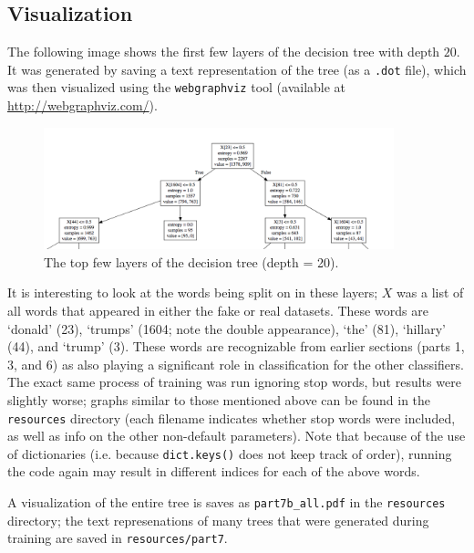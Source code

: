 \documentclass{article}
\begin{document}
   \subsection{Visualization}
   The following image shows the first few layers of the decision tree with depth $20$. It was generated by saving
   a text representation of the tree (as a \texttt{.dot} file), which was then visualized using the
   \texttt{webgraphviz} tool (available at \url{http://webgraphviz.com/}).
      \begin{figure}[h] \centering
         \includegraphics[width=4in]{resources/part7b_stopwords}
         \caption{The top few layers of the decision tree (depth = 20).}
         \label{part7b}
      \end{figure}

   It is interesting to look at the words being split on in these layers; $X$ was a list of all words
   that appeared in either the fake or real datasets. These words are `donald' (23), `trumps' (1604; note the
   double appearance), `the' (81), `hillary' (44), and `trump' (3). These words are recognizable from earlier
   sections (parts 1, 3, and 6) as also playing a significant role in classification for the other classifiers.
   The exact same process of training was run
   ignoring stop words, but results were slightly worse; graphs similar to those mentioned above can be found
   in the \texttt{resources} directory (each filename indicates whether stop words were included, as well as info
   on the other non-default parameters). Note that because of the use of dictionaries (i.e. because
   \texttt{dict.keys()} does not keep track of order), running the code again may result in different indices
   for each of the above words.


   A visualization of the entire tree is saves as \texttt{part7b\_all.pdf}
   in the \texttt{resources} directory; the text represenations of many trees that were generated during
   training are saved in \texttt{resources/part7}.
\end{document}
